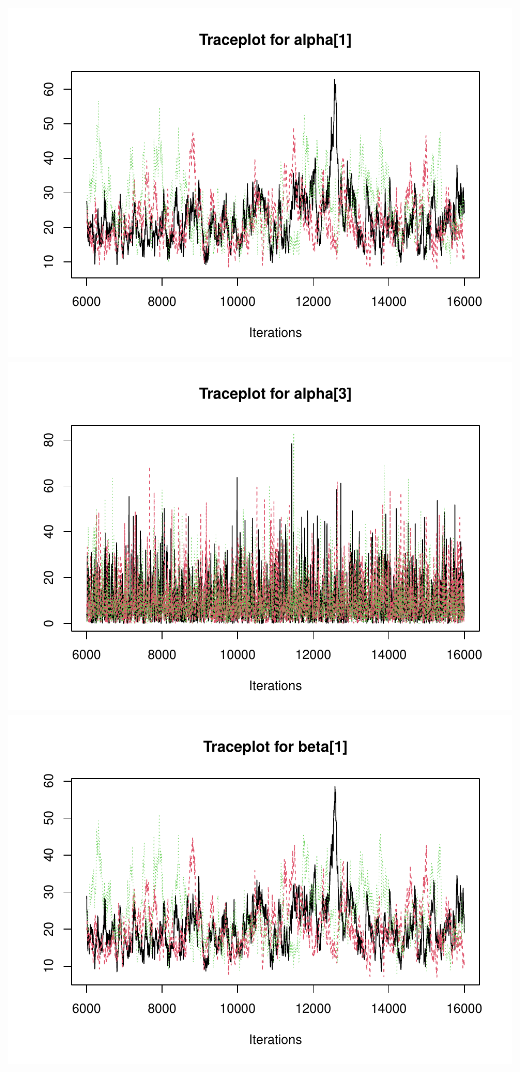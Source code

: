 \documentclass[
  11pt,
]{article}
\begin{document}
\includegraphics{Final-Project_files/figure-latex/appendix-code-2-4.pdf}
\includegraphics{Final-Project_files/figure-latex/appendix-code-2-5.pdf}
\includegraphics{Final-Project_files/figure-latex/appendix-code-2-6.pdf}
\end{document}
